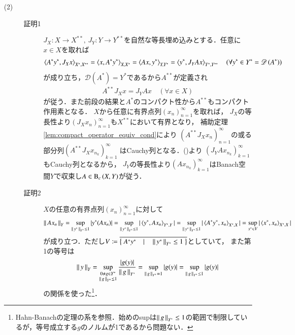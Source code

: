 \begin{prf}
\begin{description}
			\item[(2)]
				\begin{description}
					\item[証明1]
						$J_X:X \longrightarrow X^{**},\ J_Y:Y \longrightarrow Y^{**}$を自然な等長埋め込みとする．任意に$x \in X$を取れば
						\begin{align}
							\inprod<A^*y^*, J_Xx>_{X^*,X^{**}} = \inprod<x,A^*y^*>_{X,X^*} = \inprod<Ax,y^*>_{Y,Y^*} = \inprod<y^*,J_YAx>_{Y^*,Y^{**}} \quad (\forall y^* \in Y^*=\Dom{A^*} )
						\end{align}
						が成り立ち，$\mathscr{D}(A^*)=Y^*$であるから$A^{**}$が定義され
						\begin{align}
							A^{**} J_X x = J_Y A x \quad (\forall x \in X)
							\label{eq:thm_dual_operator_of_compact_operators}
						\end{align}
						が従う．また前段の結果と$A^*$のコンパクト性から$A^{**}$もコンパクト作用素となる．
						$X$から任意に有界点列$(x_n)_{n=1}^{\infty}$を取れば，
						$J_X$の等長性より$\left(J_Xx_n\right)_{n=1}^{\infty}$も$X^{**}$において有界となり，
						補助定理\ref{lem:compact_operator_equiv_cond}により
						$\left(A^{**}J_Xx_n\right)_{n=1}^{\infty}$の或る部分列$\left(A^{**}J_Xx_{n_k}\right)_{k=1}^{\infty}$
						はCauchy列となる．()より
						$\left(J_YAx_{n_k}\right)_{k=1}^{\infty}$もCauchy列となるから，
						$J_Y$の等長性より$\left(Ax_{n_k}\right)_{k=1}^{\infty}$はBanach空間$Y$で収束し$A \in \mathrm{B}_c\left(X,Y\right) $が従う．
					\item[証明2]
						$X$の任意の有界点列$(x_n)_{n=1}^{\infty}$に対して
						\begin{align}
							\Norm{Ax_n}{Y} = \sup{\Norm{y^*}{Y^*} \leq 1}{|y^*(Ax_n)|}
							= \sup{\Norm{y^*}{Y^*} \leq 1}{|\inprod<y^*,Ax_n>_{Y^*,Y}|}
							= \sup{\Norm{y^*}{Y^*} \leq 1}{|\inprod<A^*y^*,x_n>_{X^*,X}|}
							= \sup{x^* \in V}{|\inprod<x^*,x_n>_{X^*,X}|}
						\end{align}
						が成り立つ．ただし$V \coloneqq \closure{\left\{\ A^*y^*\quad |\quad \Norm{y^*}{Y^*} \leq 1\ \right\}}$としていて，
						また第1の等号は
						\begin{align}
							\left\|\, y\, \right\|_{Y} = \operatorname*{sup}_{\substack{0 \neq g \in Y^* \\ \left\|\, g\, \right\|_{Y^*}\leq1}} \frac{|g(y)|}{\left\|\, g\, \right\|_{Y^*}} 
							= \operatorname*{sup}_{\left\|\, g\, \right\|_{Y^*}=1} |g(y)| = \operatorname*{sup}_{\left\|\, g\, \right\|_{Y^*} \leq 1} |g(y)|
						\end{align}
						の関係を使った\footnote{Hahn-Banachの定理の系を参照．始めのsupは$\left\|\, g\, \right\|_{Y^*}\leq1$の範囲で制限しているが，等号成立する$g$のノルムが1であるから問題ない．}．

\end{description}
\end{description}
\end{prf}
